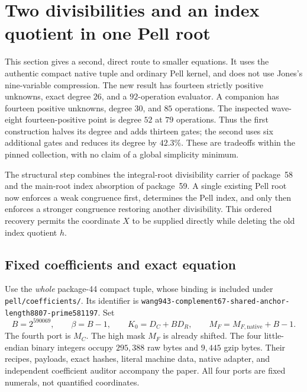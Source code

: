 \section{Two divisibilities and an index quotient in one Pell root}
\label{sec:pell-carriers}

This section gives a second, direct route to smaller equations. It uses the
authentic compact native tuple and ordinary Pell kernel, and does not use
Jones's nine-variable compression. The new result has fourteen strictly
positive unknowns, exact degree $26$, and a $92$-operation evaluator. A
companion has fourteen positive unknowns, degree $30$, and $85$ operations.
The inspected wave-eight fourteen-positive point is degree $52$ at $79$
operations. Thus the first construction halves its degree and adds thirteen
gates; the second uses six additional gates and reduces its degree by
$42.3\%$. These are tradeoffs within the pinned collection, with no claim
of a global simplicity minimum.

The structural step combines the integral-root divisibility carrier of
package~58 and the main-root index absorption of package~59. A single
existing Pell root now enforces a weak congruence first, determines the
Pell index, and only then enforces a stronger congruence restoring another
divisibility. This ordered recovery permits the coordinate $X$ to be
supplied directly while deleting the old index quotient $h$.

\subsection{Fixed coefficients and exact equation}

Use the \emph{whole} package-44 compact tuple, whose binding is included
under \texttt{pell/coefficients/}. Its identifier is
\texttt{wang943-complement67-shared-anchor-length8807-prime581197}.
Set
\[
 B=2^{590069},\qquad \beta=B-1,\qquad
 K_0=D_C+BD_R,\qquad M_F=M_{F,\mathrm{native}}+B-1.
\]
The fourth port is $M_C$. The high mask $M_F$ is already shifted. The four
little-endian binary integers occupy $295{,}388$ raw bytes and $9{,}445$
gzip bytes. Their recipes, payloads, exact hashes, literal machine data,
native adapter, and independent coefficient auditor accompany the paper.
All four ports are fixed numerals, not quantified coordinates.

